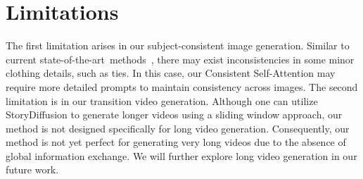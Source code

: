 \documentclass{article} %
\newcommand{\nameofmethod}{StoryDiffusion}
\newcommand{\nameofsa}{Consistent Self-Attention}
\newcommand{\sArt}{state-of-the-art~}
\begin{document}
\section{Limitations}
The first limitation arises in our subject-consistent image generation.
%
Similar to current \sArt methods~\citep{ye2023ip}, there may exist inconsistencies in some minor clothing details, such as ties.
%
In this case, our \nameofsa{} may require more detailed prompts to maintain consistency across images. 
%
The second limitation is in our transition video generation. Although one can utilize \nameofmethod{} to generate longer videos using a sliding window approach, our method is not designed specifically for long video generation.
Consequently, our method is not yet perfect for generating very long videos due to the absence of global information exchange. 
We will further explore long video generation in our future work.
\end{document}
